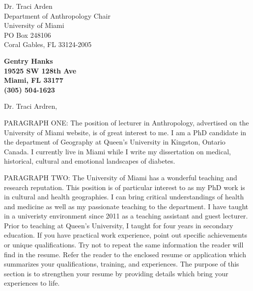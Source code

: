 \documentclass[11pt]{letter} %
\begin{document}

\begin{letter}{Dr. Traci Arden \\
Department of Anthropology Chair \\
University of Miami \\
PO Box 248106 \\
Coral Gables, FL 33124-2005} 


\begin{center}
\large\bf Gentry Hanks \\ %
19525 SW 128th Ave \\ Miami, FL 33177 \\ (305) 504-1623 %
\end{center} 
\vfill

\signature{Gentry Hanks} %


\opening{Dr. Traci Ardren,} 
 
PARAGRAPH ONE: The position of lecturer in Anthropology, advertised on the University of Miami website, is of great interest to me. I am a PhD candidate in the department of Geography at Queen's University in Kingston, Ontario Canada. I currently live in Miami while I write my dissertation on medical, historical, cultural and emotional landscapes of diabetes. 

PARAGRAPH TWO: The University of Miami has a wonderful teaching and research reputation. This position is of particular interest to as my PhD work is in cultural and health geographies. 
I can bring critical understandings of health and medicine as well as my passionate teaching to the department. I have taught in a univeristy environment since 2011 as a teaching assistant and guest lecturer. Prior to teaching at Queen's University, I taught for four years in secondary education.  If you have practical work experience, point out specific achievements or unique qualifications. Try not to repeat the same information the reader will find in the resume. Refer the reader to the enclosed resume or application which summarizes your qualifications, training, and experiences. The purpose of this section is to strengthen your resume by providing details which bring your experiences to life. 
 

\end{letter}
\end{document}
